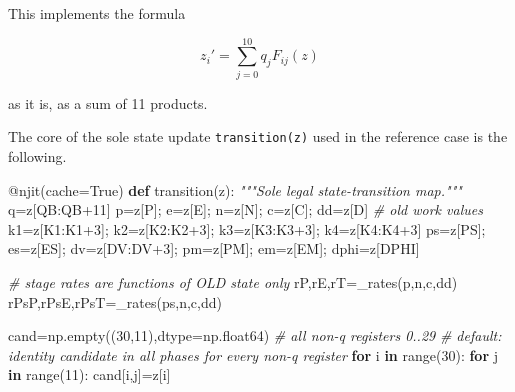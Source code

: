 \documentclass[
  a4paper,
]{article}
\newenvironment{Shaded}{}{}
\newcommand{\AttributeTok}[1]{\textcolor[rgb]{0.49,0.56,0.16}{#1}}
\newcommand{\BuiltInTok}[1]{\textcolor[rgb]{0.00,0.50,0.00}{#1}}
\newcommand{\CommentTok}[1]{\textcolor[rgb]{0.38,0.63,0.69}{\textit{#1}}}
\newcommand{\ControlFlowTok}[1]{\textcolor[rgb]{0.00,0.44,0.13}{\textbf{#1}}}
\newcommand{\DecValTok}[1]{\textcolor[rgb]{0.25,0.63,0.44}{#1}}
\newcommand{\KeywordTok}[1]{\textcolor[rgb]{0.00,0.44,0.13}{\textbf{#1}}}
\newcommand{\NormalTok}[1]{#1}
\newcommand{\OperatorTok}[1]{\textcolor[rgb]{0.40,0.40,0.40}{#1}}
\newcommand{\VariableTok}[1]{\textcolor[rgb]{0.10,0.09,0.49}{#1}}
\begin{document}
This implements the formula

\[
\boxed{
z_i'=\sum_{j=0}^{10}q_jF_{ij}(z)}
\]

as it is, as a sum of 11 products.

The core of the sole state update \texttt{transition(z)} used in the
reference case is the following.

\begin{Shaded}
\begin{Highlighting}[]
\AttributeTok{@njit}\NormalTok{(cache}\OperatorTok{=}\VariableTok{True}\NormalTok{)}
\KeywordTok{def}\NormalTok{ transition(z):}
    \CommentTok{"""Sole legal state{-}transition map."""}
\NormalTok{    q}\OperatorTok{=}\NormalTok{z[QB:QB}\OperatorTok{+}\DecValTok{11}\NormalTok{]}
\NormalTok{    p}\OperatorTok{=}\NormalTok{z[P]}\OperatorTok{;}\NormalTok{ e}\OperatorTok{=}\NormalTok{z[E]}\OperatorTok{;}\NormalTok{ n}\OperatorTok{=}\NormalTok{z[N]}\OperatorTok{;}\NormalTok{ c}\OperatorTok{=}\NormalTok{z[C]}\OperatorTok{;}\NormalTok{ dd}\OperatorTok{=}\NormalTok{z[D]}
    \CommentTok{\# old work values}
\NormalTok{    k1}\OperatorTok{=}\NormalTok{z[K1:K1}\OperatorTok{+}\DecValTok{3}\NormalTok{]}\OperatorTok{;}\NormalTok{ k2}\OperatorTok{=}\NormalTok{z[K2:K2}\OperatorTok{+}\DecValTok{3}\NormalTok{]}\OperatorTok{;}\NormalTok{ k3}\OperatorTok{=}\NormalTok{z[K3:K3}\OperatorTok{+}\DecValTok{3}\NormalTok{]}\OperatorTok{;}\NormalTok{ k4}\OperatorTok{=}\NormalTok{z[K4:K4}\OperatorTok{+}\DecValTok{3}\NormalTok{]}
\NormalTok{    ps}\OperatorTok{=}\NormalTok{z[PS]}\OperatorTok{;}\NormalTok{ es}\OperatorTok{=}\NormalTok{z[ES]}\OperatorTok{;}\NormalTok{ dv}\OperatorTok{=}\NormalTok{z[DV:DV}\OperatorTok{+}\DecValTok{3}\NormalTok{]}\OperatorTok{;}\NormalTok{ pm}\OperatorTok{=}\NormalTok{z[PM]}\OperatorTok{;}\NormalTok{ em}\OperatorTok{=}\NormalTok{z[EM]}\OperatorTok{;}\NormalTok{ dphi}\OperatorTok{=}\NormalTok{z[DPHI]}

    \CommentTok{\# stage rates are functions of OLD state only}
\NormalTok{    rP,rE,rT}\OperatorTok{=}\NormalTok{\_rates(p,n,c,dd)}
\NormalTok{    rPsP,rPsE,rPsT}\OperatorTok{=}\NormalTok{\_rates(ps,n,c,dd)}

\NormalTok{    cand}\OperatorTok{=}\NormalTok{np.empty((}\DecValTok{30}\NormalTok{,}\DecValTok{11}\NormalTok{),dtype}\OperatorTok{=}\NormalTok{np.float64)  }\CommentTok{\# all non{-}q registers 0..29}
    \CommentTok{\# default: identity candidate in all phases for every non{-}q register}
    \ControlFlowTok{for}\NormalTok{ i }\KeywordTok{in} \BuiltInTok{range}\NormalTok{(}\DecValTok{30}\NormalTok{):}
        \ControlFlowTok{for}\NormalTok{ j }\KeywordTok{in} \BuiltInTok{range}\NormalTok{(}\DecValTok{11}\NormalTok{): cand[i,j]}\OperatorTok{=}\NormalTok{z[i]}


\end{Highlighting}
\end{Shaded}
\end{document}
